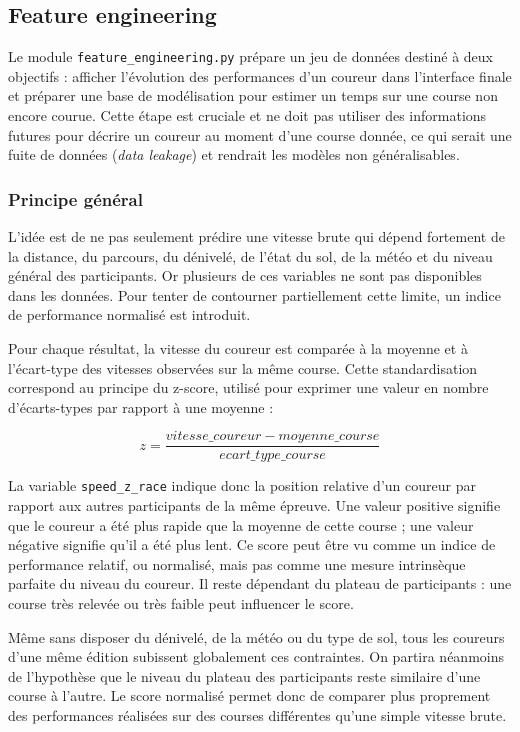\documentclass[12pt,a4paper]{article}
\begin{document}
\subsection{Feature engineering}

Le module \texttt{feature\_engineering.py} prépare un jeu de données destiné à deux objectifs : afficher l'évolution des performances d'un coureur dans l'interface finale et préparer une base de modélisation pour estimer un temps sur une course non encore courue. Cette étape est cruciale et ne doit pas utiliser des informations futures pour décrire un coureur au moment d'une course donnée, ce qui serait une fuite de données (\textit{data leakage}) et rendrait les modèles non généralisables.

\subsubsection{Principe général}

L'idée est de ne pas seulement prédire une vitesse brute qui dépend fortement de la distance, du parcours, du dénivelé, de l'état du sol, de la météo et du niveau général des participants. Or plusieurs de ces variables ne sont pas disponibles dans les données. Pour tenter de contourner partiellement cette limite, un indice de performance normalisé est introduit.

Pour chaque résultat, la vitesse du coureur est comparée à la moyenne et à l'écart-type des vitesses observées sur la même course. Cette standardisation correspond au principe du z-score, utilisé pour exprimer une valeur en nombre d'écarts-types par rapport à une moyenne \cite{openstax_zscore} :

\[
z = \frac{vitesse\_coureur - moyenne\_course}{ecart\_type\_course}
\]

La variable \texttt{speed\_z\_race} indique donc la position relative d'un coureur par rapport aux autres participants de la même épreuve. Une valeur positive signifie que le coureur a été plus rapide que la moyenne de cette course ; une valeur négative signifie qu'il a été plus lent. Ce score peut être vu comme un indice de performance relatif, ou normalisé, mais pas comme une mesure intrinsèque parfaite du niveau du coureur. Il reste dépendant du plateau de participants : une course très relevée ou très faible peut influencer le score.

Même sans disposer du dénivelé, de la météo ou du type de sol, tous les coureurs d'une même édition subissent globalement ces contraintes. On partira néanmoins de l'hypothèse que le niveau du plateau des participants reste similaire d'une course à l'autre. Le score normalisé permet donc de comparer plus proprement des performances réalisées sur des courses différentes qu'une simple vitesse brute.
\end{document}

